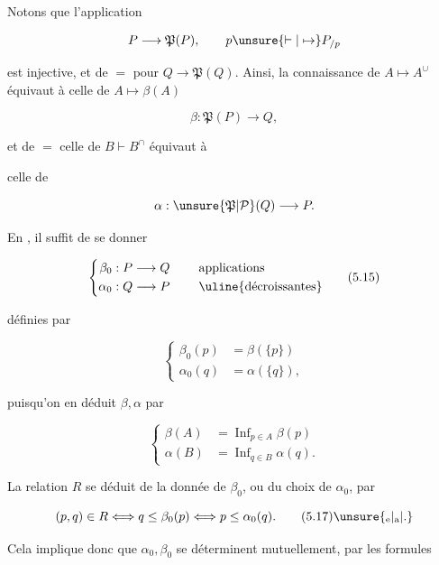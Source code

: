 Notons que l'application

\[
 P\longrightarrow\mathfrak P(P),\qquad p\unsure{\vdash|\mapsto} P_{/p}
\]

est injective, et de $=$ pour $Q\to\mathfrak P(Q)$. Ainsi, la connaissance de $A\mapsto A^\cup$ équivaut à celle de $A\longmapsto\beta(A)$

\[
 \beta:\mathfrak P(P)\longrightarrow Q,
\]

et de $=$ celle de $B\vdash B^\cap$ équivaut à

celle de

\[
 \alpha:\unsure{\mathfrak P|\mathcal P}(Q)\longrightarrow P.
\]

 En , il suffit de se donner

\[
 \left\{\begin{aligned}
  \beta_0 &:P\longrightarrow Q\\
  \alpha_0 &:Q\longrightarrow P
 \end{aligned}\right.\qquad
 \begin{aligned}&\text{applications}\\&\text{\uline{décroissantes}}\end{aligned}
 \tag*{(5.15)}
\]

 définies par

\[
 \left\{\begin{aligned}
 \beta_0(p)&=\beta(\{p\})\\
 \alpha_0(q)&=\alpha(\{q\}),
 \end{aligned}\right.
\]

puisqu'on en déduit $\beta,\alpha$ par

\[
 \left\{\begin{aligned}
 \beta(A)&=\mathop{\mathrm{Inf}}_{p\in A}\beta(p)\\
 \alpha(B)&=\mathop{\mathrm{Inf}}_{q\in B}\alpha(q).
 \end{aligned}\right.
 \tag*{(5.16)}
\]

La relation $R$ se déduit de la donnée de $\beta_0$, ou du choix de $\alpha_0$, par

\[
 (p,q)\in R\Longleftrightarrow q\leq\beta_0(p)\Longleftrightarrow p\leq\alpha_0(q).
 \tag*{(5.17)\unsure{\textsubscript{e}|\textsubscript{a}|.}}
\]

Cela implique donc que $\alpha_0,\beta_0$ se déterminent mutuellement, par les formules

